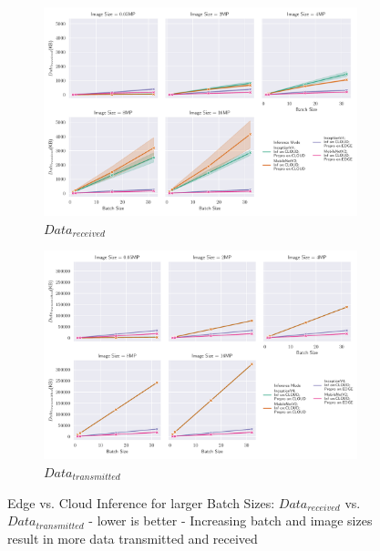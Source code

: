 \begin{figure}[!htb]
\centering
\begin{subfigure}[b]{0.95\textwidth}
   \includegraphics[width=1\linewidth]{./Bilder/single_plots/batch_size_plots/Effects_of_Batch_size_Received_Data.pdf}
   \caption{$Data_{received}$}
   \label{fig:BatchSizeReceivedData} 
\end{subfigure}

\begin{subfigure}[b]{0.95\textwidth}
   \includegraphics[width=1\linewidth]{./Bilder/single_plots/batch_size_plots/Effects_of_Batch_size_Transmitted_Data.pdf}
   \caption{$Data_{transmitted}$}
   \label{fig:BatchSizeTransmittedData}
\end{subfigure}

\caption{Edge vs.  Cloud Inference for larger Batch Sizes:  $Data_{received}$ vs. $Data_{transmitted}$ - lower is better - Increasing batch and image sizes result in more data transmitted and received}
\end{figure}


